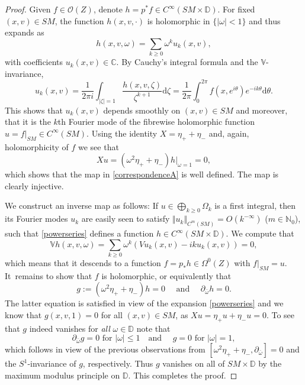 \documentclass[JEP,XML,SOM,Unicode,published]{cedram}
\theoremstyle{plain}
\theoremstyle{definition}
\newcommand{\N}{\mathbb{N}}
\newcommand{\C}{\mathbb{C}}
\newcommand{\DD}{\mathbb{D}}
\newcommand{\V}{\mathbb{V}}
\renewcommand{\O}{\mathcal{O}}
\renewcommand{\d}{\mathrm{d}}
\newcommand{\1}{{\bf 1}}
\begin{document}
\begin{proof}
Given $f\in \O(Z)$, denote $h = p^* f\in C^\infty(SM\times \DD)$. For fixed $(x,v)\in SM$, the function $h(x,v,\cdot)$ is holomorphic in $\{\vert \omega \vert <1\}$ and thus expands as
\begin{equation}\label{powerseries}
h(x,v,\omega) = \sum_{k\ge 0} \omega^k u_k(x,v),
\end{equation}
with coefficients $u_k(x,v)\in \C$. By Cauchy's integral formula and the $\V$-invariance,
\begin{equation*}
u_k(x,v) = \frac1{2\pi i}\int_{\vert \zeta \vert =1} \frac{h(x,v,\zeta)}{\zeta^{k+1}} \d\zeta = \frac{1}{2\pi}\int_0^{2\pi} f(x,e^{i\theta}) e^{-ik\theta}\d\theta.
\end{equation*}
This shows that $u_k(x,v)$ depends smoothly on $(x,v)\in SM$ and moreover, that it is the $k$th Fourier mode of the fibrewise holomorphic function $u=f\vert_{SM}\in C^\infty(SM)$. Using the identity $X=\eta_++\eta_-$ and, again, holomorphicity of $f$ we see that
\begin{equation*}
Xu = (\omega^2 \eta_+ + \eta_-) h \vert_{\omega =1} = 0,
\end{equation*}
which shows that the map in \eqref{correspondenceA} is well defined. The map is clearly injective.

We construct an inverse map as follows: If $u\in \bigoplus_{k\ge 0} \Omega_k$ is a first integral, then its Fourier modes $u_k$ are easily seen to satisfy $\Vert u_k \Vert_{C^m(SM)} = O(k^{-\infty})$ ($m\in \N_0$), such that \eqref{powerseries} defines a function $h\in C^\infty(SM\times \DD)$. We compute that
\begin{equation} \label{powerseries2} \V h(x,v,\omega) = \sum_{k\ge 0} \omega^k (V u_k(x,v) - i k u_k(x,v))=0,
\end{equation}
which means that it descends to a function $f=p_*h \!\in\! \Omega^0(Z)$ with $f\vert_{SM} \!=\! u$. It~remains to show that $f$ is holomorphic, or equivalently that
\begin{equation*}
g:=(\omega^2 \eta_+ + \eta_-) h = 0 \quad \text{ and } \quad \partial_{\bar \omega}h =0.
\end{equation*}
The latter equation is satisfied in view of the expansion \eqref{powerseries} and we know that $g(x,v,1)=0$ for all $(x,v)\in SM$, as $Xu=\eta_+ u + \eta_- u=0$. To see that $g$ indeed vanishes for \emph{all} $\omega \in \DD$ note that
\begin{equation*}
\partial_{\bar \omega}g=0 \text{ for } \vert \omega \vert \le 1\quad \text {and } \quad g = 0 \text{ for } \vert \omega \vert =1,
\end{equation*}
which follows in view of the previous observations from $[\omega^2\eta_++\eta_-,\partial_{\bar \omega}]=0$ and the $S^1$-invariance of $g$, respectively. Thus $g$ vanishes on all of $SM\times \DD$ by the maximum modulus principle on $\DD$. This completes the proof.
\end{proof}
\end{document}
